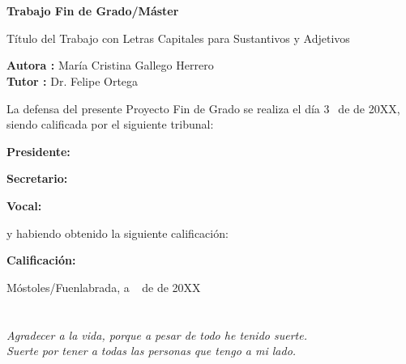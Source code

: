 \documentclass[a4paper, 12pt]{book}
\begin{document}
\newpage
\mbox{}
\thispagestyle{empty} %


\clearpage
{}
\chapter*{}

\vspace{-4cm}
\begin{center}
\LARGE
\textbf{Trabajo Fin de Grado/Máster}

\vspace{1cm}
\large
Título del Trabajo con Letras Capitales para Sustantivos y Adjetivos

\vspace{1cm}
\large
\textbf{Autora :} María Cristina Gallego Herrero  \\
\textbf{Tutor :} Dr. Felipe Ortega 

\end{center}

\vspace{1cm}
La defensa del presente Proyecto Fin de Grado se realiza el día 3\qquad$\;\,$ de
\qquad\qquad\qquad\qquad \newline de 20XX, siendo calificada por el siguiente tribunal:


\vspace{0.5cm}
\textbf{Presidente:}

\vspace{0.8cm}
\textbf{Secretario:}

\vspace{0.8cm}
\textbf{Vocal:}


\vspace{0.8cm}
y habiendo obtenido la siguiente calificación:

\vspace{0.8cm}
\textbf{Calificación:}


\vspace{0.8cm}
\begin{flushright}
Móstoles/Fuenlabrada, a \qquad$\;\,$ de \qquad\qquad\qquad\qquad de 20XX
\end{flushright}


\chapter*{}
\begin{flushright}
\textit{Agradecer a la vida, porque a pesar de todo he tenido suerte. \\
 Suerte por tener a todas las personas que tengo a mi lado.\\}
\end{flushright}
\end{document}
